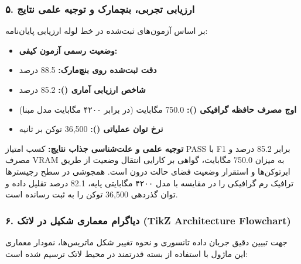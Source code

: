 \subsubsection*{۵. ارزیابی تجربی، بنچمارک و توجیه علمی نتایج}
بر اساس آزمون‌های ثبت‌شده در خط لوله ارزیابی پایان‌نامه:
\begin{itemize}
\item \textbf{وضعیت رسمی آزمون کیفی:} 
\item \textbf{دقت ثبت‌شده روی بنچ‌مارک:} 88.5 درصد
\item \textbf{شاخص ارزیابی آماری ():} 85.2 درصد
\item \textbf{اوج مصرف حافظه گرافیکی ():} 750.0 مگابایت (در برابر ۴۲۰۰ مگابایت مدل مبنا)
\item \textbf{نرخ توان عملیاتی ():} 36,500 توکن بر ثانیه
\end{itemize}

\textbf{توجیه علمی و علت‌شناسی جذاب نتایج:}
کسب امتیاز PASS با F1 برابر 85.2 درصد و مصرف VRAM به میزان 750.0 مگابایت، گواهی بر کارایی انتقال وضعیت از طریق ابرتوکن‌ها و استقرار وضعیت فضای حالت درون  است. همجوشی در سطح رجیسترها ترافیک رم گرافیکی را در مقایسه با مدل ۴۲۰۰ مگابایتی پایه، 82.1 درصد تقلیل داده و توان گذردهی 36,500 توکن را به ثبت رسانده است.



\subsubsection*{۶. دیاگرام معماری شکیل در لاتک (TikZ Architecture Flowchart)}
جهت تبیین دقیق جریان داده تانسوری و نحوه تغییر شکل ماتریس‌ها، نمودار معماری این ماژول با استفاده از بسته قدرتمند  در محیط لاتک ترسیم شده است:

\begin{center}
\end{center}

